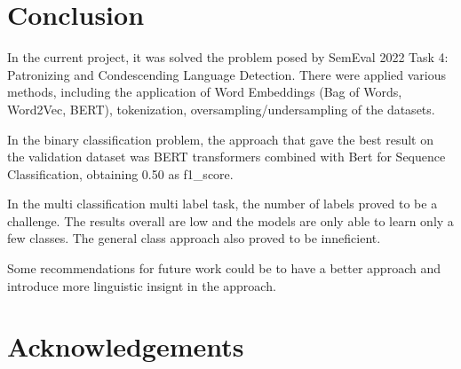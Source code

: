 \documentclass[11pt]{article}
\begin{document}
\begin{enumerate}
\begin{enumerate}
	      \end{enumerate}
\end{enumerate}


\section{Conclusion}

In the current project, it was solved the problem posed by SemEval 2022 Task
4: Patronizing and Condescending Language Detection. There were applied
various methods, including the application of Word Embeddings (Bag of Words,
Word2Vec, BERT), tokenization, oversampling/undersampling of the datasets.

In the binary classification problem, the approach that gave the best result
on the validation dataset was BERT transformers combined with Bert for
Sequence Classification, obtaining 0.50 as f1\_score.

In the multi classification multi label task, the number of labels proved to
be a challenge. The results overall are low and the models are only able to learn
only a few classes. The general class approach also proved to be inneficient.

Some recommendations for future work could be to have a better approach and introduce
more linguistic insignt in the approach.

\section*{Acknowledgements}




\end{document}
